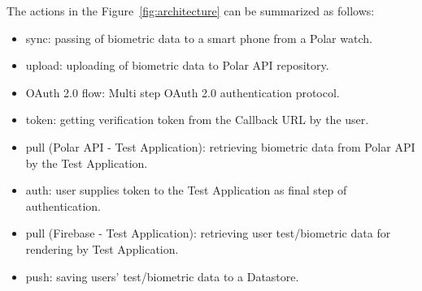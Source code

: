 \documentclass{report}
\begin{document}
        The actions in the Figure~\ref{fig:architecture} can be summarized as follows:
        \begin{itemize}
            \item{sync}: passing of biometric data to a smart phone from a Polar watch.
            \item {upload}: uploading of biometric data to Polar API repository.
            \item {OAuth 2.0 flow}: Multi step OAuth 2.0 authentication protocol. 
            \item {token}: getting verification token from the Callback URL by the user.
            \item {pull (Polar API - Test Application)}: retrieving biometric data from Polar API by the Test Application.
            \item {auth}: user supplies token to the Test Application as final step of authentication. 
            \item {pull (Firebase - Test Application)}: retrieving user test/biometric data for rendering by Test Application.
            \item {push}: saving users' test/biometric data to a Datastore.
        \end{itemize}
\end{document}
